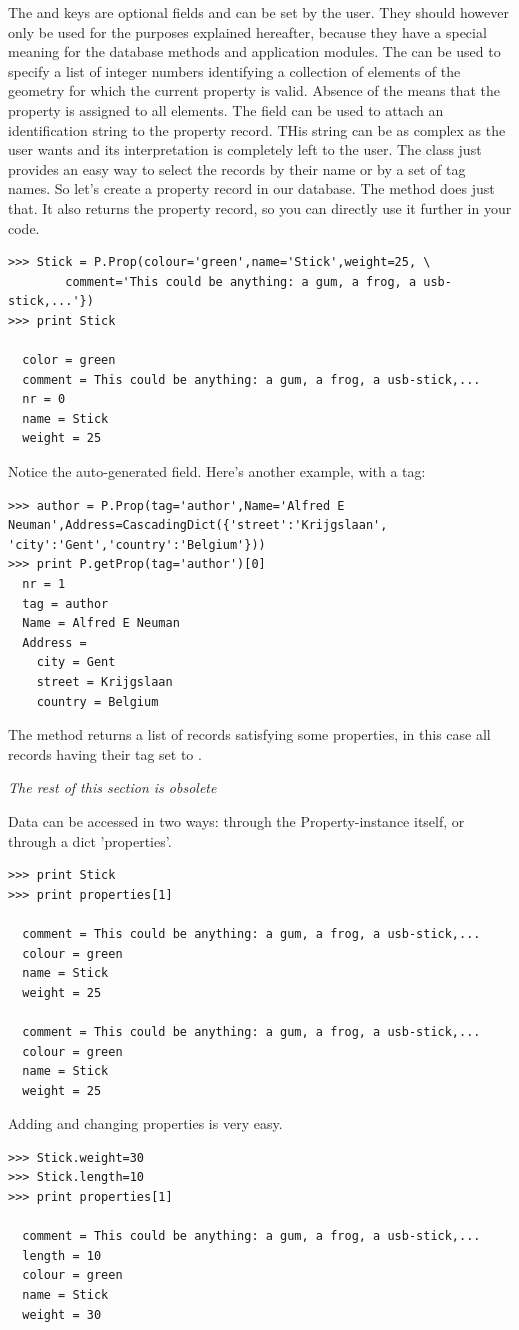 The  and  keys are optional fields and can be set by the user. They should however only be used for the purposes explained hereafter, because they have a special meaning for the database methods and application modules. The  can be used to specify a list of integer numbers identifying a collection of elements of the geometry for which the current property is valid. Absence of the  means that the property is assigned to all elements. The  field can be used to attach an identification string to the property record. THis string can be as complex as the user wants and its interpretation is completely left to the user. The  class just provides an easy way to select the records by their  name or by a set of tag names.  
So let's create a property record in our database. The  method does just that. It also returns the property record, so you can directly use it further in your code.
\begin{verbatim}
>>> Stick = P.Prop(colour='green',name='Stick',weight=25, \
        comment='This could be anything: a gum, a frog, a usb-stick,...'})
>>> print Stick

  color = green
  comment = This could be anything: a gum, a frog, a usb-stick,...
  nr = 0
  name = Stick
  weight = 25
\end{verbatim}
Notice the auto-generated  field. Here's another example, with a tag:
\begin{verbatim}
>>> author = P.Prop(tag='author',Name='Alfred E Neuman',Address=CascadingDict({'street':'Krijgslaan', 'city':'Gent','country':'Belgium'}))
>>> print P.getProp(tag='author')[0]
  nr = 1
  tag = author
  Name = Alfred E Neuman
  Address = 
    city = Gent
    street = Krijgslaan
    country = Belgium
\end{verbatim}
The  method returns a list of records satisfying some properties, in this case all records having their tag set to .


\emph{The rest of this section is obsolete}

Data can be accessed in two ways: through the Property-instance itself, or through a dict 'properties'. 
\begin{verbatim}    
>>> print Stick
>>> print properties[1] 

  comment = This could be anything: a gum, a frog, a usb-stick,...
  colour = green
  name = Stick
  weight = 25

  comment = This could be anything: a gum, a frog, a usb-stick,...
  colour = green
  name = Stick
  weight = 25
\end{verbatim}
Adding and changing properties is very easy.
\begin{verbatim}  
>>> Stick.weight=30
>>> Stick.length=10
>>> print properties[1]

  comment = This could be anything: a gum, a frog, a usb-stick,...
  length = 10
  colour = green
  name = Stick
  weight = 30
\end{verbatim}

